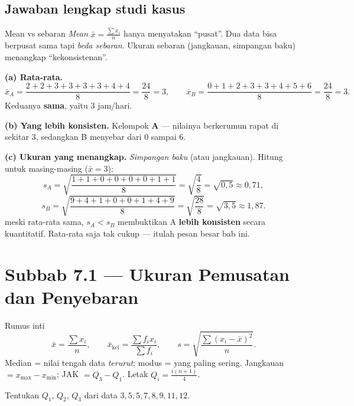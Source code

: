 \subsection*{Jawaban lengkap studi kasus}

\begin{ingat}{Mean vs sebaran}
\emph{Mean} $\bar x=\frac{\sum x_i}{n}$ hanya menyatakan ``pusat''. Dua data
bisa berpusat sama tapi \emph{beda sebaran}. Ukuran sebaran (jangkauan,
simpangan baku) menangkap ``kekonsistenan''.
\end{ingat}

\textbf{(a) Rata-rata.}
\[
\bar x_A=\frac{2+2+3+3+3+3+4+4}{8}=\frac{24}{8}=3,\qquad
\bar x_B=\frac{0+1+2+3+3+4+5+6}{8}=\frac{24}{8}=3.
\]
Keduanya \textbf{sama}, yaitu $3$ jam/hari.

\textbf{(b) Yang lebih konsisten.} Kelompok \textbf{A} --- nilainya berkerumun
rapat di sekitar $3$, sedangkan B menyebar dari $0$ sampai $6$.

\textbf{(c) Ukuran yang menangkap.} \emph{Simpangan baku} (atau jangkauan).
Hitung untuk masing-masing ($\bar x=3$):
\[
s_A=\sqrt{\frac{1+1+0+0+0+0+1+1}{8}}=\sqrt{\frac{4}{8}}=\sqrt{0{,}5}\approx0{,}71,
\]
\[
s_B=\sqrt{\frac{9+4+1+0+0+1+4+9}{8}}=\sqrt{\frac{28}{8}}=\sqrt{3{,}5}\approx1{,}87.
\]
\jadi meski rata-rata sama, $s_A<s_B$ membuktikan A \textbf{lebih konsisten}
secara kuantitatif. Rata-rata saja tak cukup --- itulah pesan besar bab ini.

\section*{Subbab 7.1 — Ukuran Pemusatan dan Penyebaran}

\begin{ingat}{Rumus inti}
\[
\bar x=\frac{\sum x_i}{n},\qquad \bar x_{\text{kel}}=\frac{\sum f_ix_i}{\sum f_i},
\qquad s=\sqrt{\frac{\sum(x_i-\bar x)^2}{n}}.
\]
Median = nilai tengah data \emph{terurut}; modus = yang paling sering.
Jangkauan $=x_{\max}-x_{\min}$; JAK $=Q_3-Q_1$. Letak $Q_i=\frac{i(n+1)}{4}$.
\end{ingat}

\begin{soalbox}{}
Tentukan $Q_1$, $Q_2$, $Q_3$ dari data $3,5,5,7,8,9,11,12$.
\end{soalbox}

